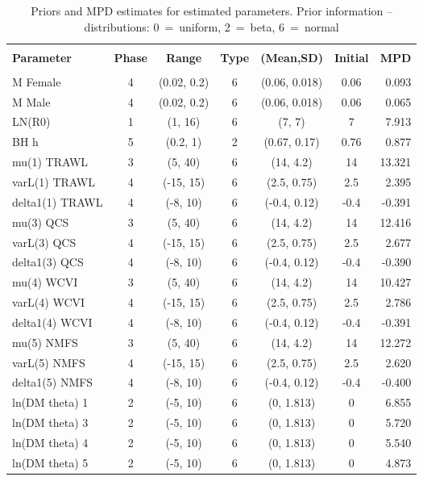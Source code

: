 
\setlength{\tabcolsep}{2pt}
\begin{table}[!h]
\centering
\caption{Priors and MPD estimates for estimated parameters. Prior information -- distributions: 0~=~uniform, 2~=~beta, 6~=~normal}
\label{tab:parest}
\usefont{\encodingdefault}{\familydefault}{\seriesdefault}{\shapedefault}\small
\begin{tabular}{lcccccr}
\hline \\ [-1.5ex]
{\bf Parameter} & {\bf Phase} & {\bf Range} & {\bf Type} & {\bf (Mean,SD)} & {\bf Initial} & {\bf MPD} \\ [1ex]
\hline \\ [-1.5ex]
M Female & 4 & (0.02, 0.2) & 6 & (0.06, 0.018) & 0.06 & 0.093 \\
M Male & 4 & (0.02, 0.2) & 6 & (0.06, 0.018) & 0.06 & 0.065 \\
LN(R0) & 1 & (1, 16) & 6 & (7, 7) & 7 & 7.913 \\
BH h & 5 & (0.2, 1) & 2 & (0.67, 0.17) & 0.76 & 0.877 \\
mu(1) TRAWL & 3 & (5, 40) & 6 & (14, 4.2) & 14 & 13.321 \\
varL(1) TRAWL & 4 & (-15, 15) & 6 & (2.5, 0.75) & 2.5 & 2.395 \\
delta1(1) TRAWL & 4 & (-8, 10) & 6 & (-0.4, 0.12) & -0.4 & -0.391 \\
mu(3) QCS & 3 & (5, 40) & 6 & (14, 4.2) & 14 & 12.416 \\
varL(3) QCS & 4 & (-15, 15) & 6 & (2.5, 0.75) & 2.5 & 2.677 \\
delta1(3) QCS & 4 & (-8, 10) & 6 & (-0.4, 0.12) & -0.4 & -0.390 \\
mu(4) WCVI & 3 & (5, 40) & 6 & (14, 4.2) & 14 & 10.427 \\
varL(4) WCVI & 4 & (-15, 15) & 6 & (2.5, 0.75) & 2.5 & 2.786 \\
delta1(4) WCVI & 4 & (-8, 10) & 6 & (-0.4, 0.12) & -0.4 & -0.391 \\
mu(5) NMFS & 3 & (5, 40) & 6 & (14, 4.2) & 14 & 12.272 \\
varL(5) NMFS & 4 & (-15, 15) & 6 & (2.5, 0.75) & 2.5 & 2.620 \\
delta1(5) NMFS & 4 & (-8, 10) & 6 & (-0.4, 0.12) & -0.4 & -0.400 \\
ln(DM theta) 1 & 2 & (-5, 10) & 6 & (0, 1.813) & 0 & 6.855 \\
ln(DM theta) 3 & 2 & (-5, 10) & 6 & (0, 1.813) & 0 & 5.720 \\
ln(DM theta) 4 & 2 & (-5, 10) & 6 & (0, 1.813) & 0 & 5.540 \\
ln(DM theta) 5 & 2 & (-5, 10) & 6 & (0, 1.813) & 0 & 4.873 \\
\hline
\end{tabular}
\usefont{\encodingdefault}{\familydefault}{\seriesdefault}{\shapedefault}\normalsize
\end{table}

